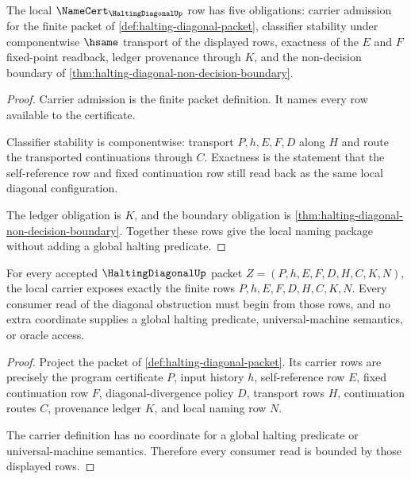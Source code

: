 \begin{theorem}\label{thm:halting-diagonal-namecert-obligations}
The local $\NameCert_{\HaltingDiagonalUp}$ row has five obligations: carrier admission for the finite packet of \autoref{def:halting-diagonal-packet}, classifier stability under componentwise $\hsame$ transport of the displayed rows, exactness of the $E$ and $F$ fixed-point readback, ledger provenance through $K$, and the non-decision boundary of \autoref{thm:halting-diagonal-non-decision-boundary}.
\end{theorem}
\begin{proof}
Carrier admission is the finite packet definition. It names every row available to the certificate.

Classifier stability is componentwise: transport $P,h,E,F,D$ along $H$ and route the transported continuations through $C$. Exactness is the statement that the self-reference row and fixed continuation row still read back as the same local diagonal configuration.

The ledger obligation is $K$, and the boundary obligation is \autoref{thm:halting-diagonal-non-decision-boundary}. Together these rows give the local naming package without adding a global halting predicate.
\end{proof}

\begin{theorem}\label{thm:halting-diagonal-carrier-exposure-obligation}
For every accepted $\HaltingDiagonalUp$ packet $Z=(P,h,E,F,D,H,C,K,N)$, the local carrier exposes exactly the finite rows $P,h,E,F,D,H,C,K,N$. Every consumer read of the diagonal obstruction must begin from those rows, and no extra coordinate supplies a global halting predicate, universal-machine semantics, or oracle access.
\end{theorem}
\begin{proof}
Project the packet of \autoref{def:halting-diagonal-packet}. Its carrier rows are precisely the program certificate $P$, input history $h$, self-reference row $E$, fixed continuation row $F$, diagonal-divergence policy $D$, transport rows $H$, continuation routes $C$, provenance ledger $K$, and local naming row $N$.

The carrier definition has no coordinate for a global halting predicate or universal-machine semantics. Therefore every consumer read is bounded by those displayed rows.
\end{proof}

